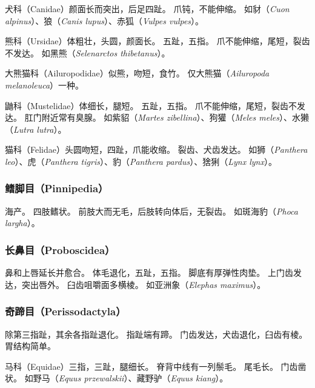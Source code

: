 \documentclass[11pt]{article}
\begin{document}
犬科（Canidae）颜面长而突出，后足四趾。
爪钝，不能伸缩。
如豺（\textit{Cuon alpinus}）、狼（\textit{Canis lupus}）、赤狐（\textit{Vulpes vulpes}）。

\newline

熊科（Ursidae）体粗壮，头圆，颜面长。
五趾，五指。
爪不能伸缩，尾短，裂齿不发达。
如黑熊（\textit{Selenarctos thibetanus}）。

\newline

大熊猫科（Ailuropodidae）似熊，吻短，食竹。
仅大熊猫（\textit{Ailuropoda melanoleuca}）一种。

\newline

鼬科（Mustelidae）体细长，腿短。
五趾，五指。
爪不能伸缩，尾短，裂齿不发达。
肛门附近常有臭腺。
如紫貂（\textit{Martes zibellina}）、狗獾（\textit{Meles meles}）、水獭（\textit{Lutra lutra}）。

\newline

猫科（Felidae）头圆吻短，四趾，爪能收缩。
裂齿、犬齿发达。
如狮（\textit{Panthera leo}）、虎（\textit{Panthera tigris}）、豹（\textit{Panthera pardus}）、猞猁（\textit{Lynx lynx}）。

\subsubsection{鳍脚目（Pinnipedia）}
海产。
四肢鳍状。
前肢大而无毛，后肢转向体后，无裂齿。
如斑海豹（\textit{Phoca largha}）。

\subsubsection{长鼻目（Proboscidea）}
鼻和上唇延长并愈合。
体毛退化，五趾，五指。
脚底有厚弹性肉垫。
上门齿发达，突出唇外。
臼齿咀嚼面多横棱。
如亚洲象（\textit{Elephas maximus}）。

\subsubsection{奇蹄目（Perissodactyla）}
除第三指趾，其余各指趾退化。
指趾端有蹄。
门齿发达，犬齿退化，臼齿有棱。
胃结构简单。

\newline

马科（Equidae）三指，三趾，腿细长。
脊背中线有一列鬃毛。
尾毛长。
门齿凿状。
如野马（\textit{Equus przewalskii}）、藏野驴（\textit{Equus kiang}）。
\end{document}
